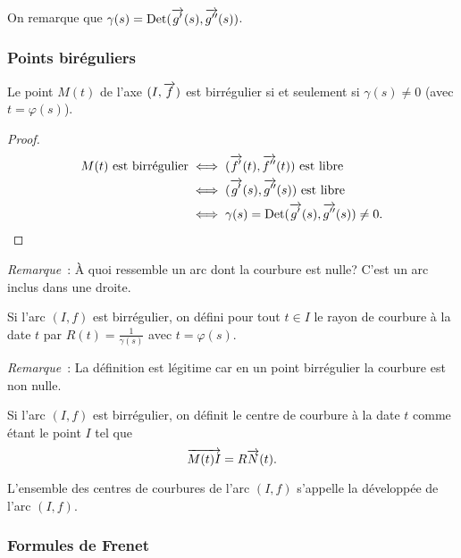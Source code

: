 On remarque que \(\gamma(s)=\operatorname{Det}(\overrightarrow{g'}(s), \overrightarrow{g''}(s))\).

\subsubsection{Points biréguliers}

\begin{prop}
  Le point \(M(t)\) de l'axe \((I, \overrightarrow{f})\) est birrégulier si et seulement 
  si \(\gamma(s)\neq 0\) (avec \(t=\varphi(s)\)).
\end{prop}
\begin{proof}
  \begin{align}
    M(t) \text{~est birrégulier} &\iff (\overrightarrow{f'}(t), \overrightarrow{f''}(t)) \text{~est 
    libre}\\
                                 &\iff (\overrightarrow{g'}(s), \overrightarrow{g''}(s)) \text{~est 
                                 libre}\\
                                 &\iff \gamma(s)=\operatorname{Det}(\overrightarrow{g'}(s), 
                                 \overrightarrow{g''}(s)) \neq 0.
    \end{align}
  \end{proof}

  \emph{Remarque}~: À quoi ressemble un arc dont la courbure est nulle? C'est un 
  arc inclus dans une droite.

  \begin{defdef}
    Si l'arc \((I,f)\) est birrégulier, on défini pour tout \(t \in I\) le rayon 
    de courbure à la date \(t\) par \(R(t) = \frac{1}{\gamma(s)}\) avec 
    \(t=\varphi(s)\).
  \end{defdef}

  \emph{Remarque}~: La définition est légitime car en un point birrégulier la 
  courbure est non nulle.

  \begin{defdef}
    Si l'arc \((I,f)\) est birrégulier, on définit le centre de courbure à la 
    date \(t\) comme étant le point \(I\) tel que
    \begin{equation}
      \overrightarrow{M(t)I} = R \overrightarrow{N}(t).
    \end{equation}
  \end{defdef}
  L'ensemble des centres de courbures de l'arc \((I, f)\) s'appelle la 
  développée de l'arc \((I, f)\).

  \subsubsection{Formules de Frenet}

